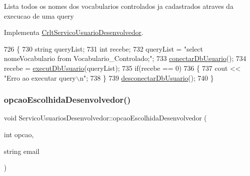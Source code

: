 Lista todos os nomes dos vocabularios controlados ja cadastrados atraves da execucao de uma query

Implementa \mbox{\hyperlink{class_crlt_servico_usuario_desenvolvedor_abb3f10c499ac67d02987f0860150393d}{Crlt\+Servico\+Usuario\+Desenvolvedor}}.


\begin{DoxyCode}
726 \{
730   \textcolor{keywordtype}{string} queryList;
731   \textcolor{keywordtype}{int} recebe;
732   queryList = \textcolor{stringliteral}{"select nomeVocabulario from Vocabulario\_Controlado;"};
733   \mbox{\hyperlink{comando_sql_8cpp_a4f89ddcbc4cf8f2587d89f72f8c7900d}{conectarDbUsuario}}();
734   recebe = \mbox{\hyperlink{comando_sql_8cpp_a748197580e7f9acdbf48c78de1f7924b}{executDbUsuario}}(queryList);
735   \textcolor{keywordflow}{if}(recebe == 0)
736   \{
737     cout << \textcolor{stringliteral}{"Erro ao executar query\(\backslash\)n"};
738   \}
739   \mbox{\hyperlink{comando_sql_8cpp_a969be9911913568e30d4ae8963338bc3}{desconectarDbUsuario}}();
740 \}
\end{DoxyCode}
\mbox{\label{class_servico_usuarios_desenvolvedor_a0214220e4cbac89da4ca22b10ac57c4e}} 
\subsubsection{\texorpdfstring{opcao\+Escolhida\+Desenvolvedor()}{opcaoEscolhidaDesenvolvedor()}}
{\footnotesize\ttfamily void Servico\+Usuarios\+Desenvolvedor\+::opcao\+Escolhida\+Desenvolvedor (\begin{DoxyParamCaption}\item[{int}]{opcao,  }\item[{string}]{email }\end{DoxyParamCaption})}


